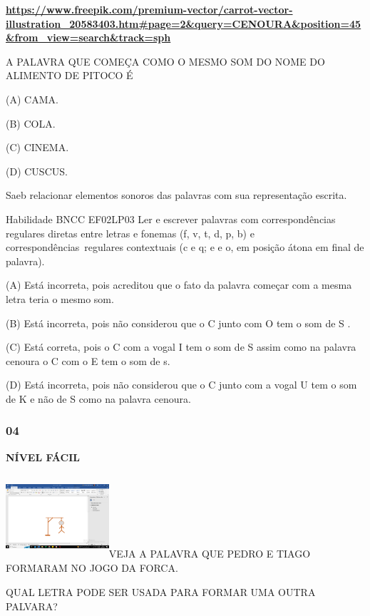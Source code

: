 \href{https://www.freepik.com/premium-vector/carrot-vector-illustration_20583403.htm\#page=2\&query=CENOURA\&position=45\&from_view=search\&track=sph}{\textbf{https://www.freepik.com/premium-vector/carrot-vector-illustration\_20583403.htm\#page=2\&query=CENOURA\&position=45\&from\_view=search\&track=sph}}

\protect\hypertarget{_Hlk129504325}{}{}A PALAVRA QUE COMEÇA COMO O MESMO
SOM DO NOME DO ALIMENTO DE PITOCO É

(A) CAMA.

(B) COLA.

(C) CINEMA.

(D) CUSCUS.

Saeb relacionar elementos sonoros das palavras com sua representação
escrita.

Habilidade BNCC EF02LP03 Ler e escrever palavras com correspondências
regulares diretas entre letras e fonemas (f, v, t, d, p, b) e
correspondências~regulares contextuais (c e q; e e o, em posição átona
em final de palavra).

\protect\hypertarget{_Hlk129366993}{}{}(A) Está incorreta, pois
acreditou que o fato da palavra começar com a mesma letra teria o mesmo
som.

(B) Está incorreta, pois não considerou que o C junto com O tem o som de
S .

(C) Está correta, pois o C com a vogal I tem o som de S assim como na
palavra cenoura o C com o E tem o som de s.

(D) Está incorreta, pois não considerou que o C junto com a vogal U tem
o som de K e não de S como na palavra cenoura.

\subsubsection{04}\label{section-114}

\textbf{NÍVEL FÁCIL}

\includegraphics[width=1.50909in,height=1.22355in]{media/image150.png}VEJA
A PALAVRA QUE PEDRO E TIAGO FORMARAM NO JOGO DA FORCA.

\protect\hypertarget{_Hlk129505254}{}{}QUAL LETRA PODE SER USADA PARA
FORMAR UMA OUTRA PALVARA?

